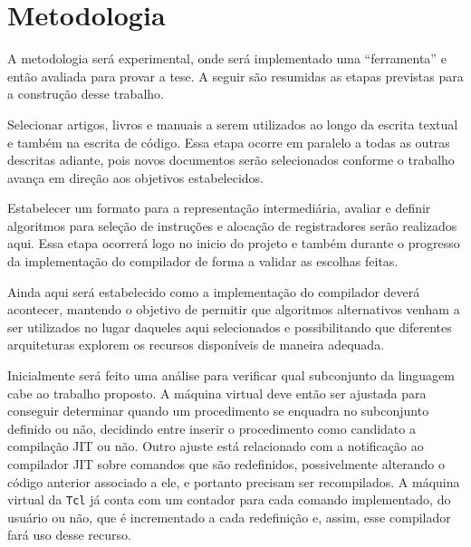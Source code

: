 

\section{Metodologia}

A metodologia será experimental, onde será implementado uma
``ferramenta'' e então avaliada para provar a tese. A seguir são
resumidas as etapas previstas para a construção desse trabalho.
\quad\\


Selecionar artigos, livros e manuais a serem utilizados ao longo da
escrita textual e também na escrita de código. Essa etapa ocorre em
paralelo a todas as outras descritas adiante, pois novos
documentos serão selecionados conforme o trabalho avança em direção
aos objetivos estabelecidos.


Estabelecer um formato para a representação intermediária, avaliar e
definir algoritmos para seleção de instruções e alocação de
registradores serão realizados aqui. Essa etapa ocorrerá logo no inicio
do projeto e também durante o progresso da implementação do compilador
de forma a validar as escolhas feitas.

Ainda aqui será estabelecido como a implementação do compilador deverá
acontecer, mantendo o objetivo de permitir que algoritmos
alternativos venham a ser utilizados no lugar daqueles aqui
selecionados e possibilitando que diferentes arquiteturas explorem os
recursos disponíveis de maneira adequada.


Inicialmente será feito uma análise para verificar qual subconjunto da
linguagem cabe ao trabalho proposto. A máquina virtual deve então ser
ajustada para conseguir determinar quando um procedimento se enquadra no
subconjunto definido ou não, decidindo entre inserir o
procedimento como candidato a compilação JIT ou não. Outro ajuste está
relacionado com a notificação ao compilador JIT sobre comandos que são
redefinidos, possivelmente alterando o código anterior associado a ele, e
portanto precisam ser recompilados. A máquina virtual da \texttt{Tcl}
já conta com um contador para cada comando implementado, do usuário ou
não, que é incrementado a cada redefinição e, assim, esse
compilador fará uso desse recurso.

